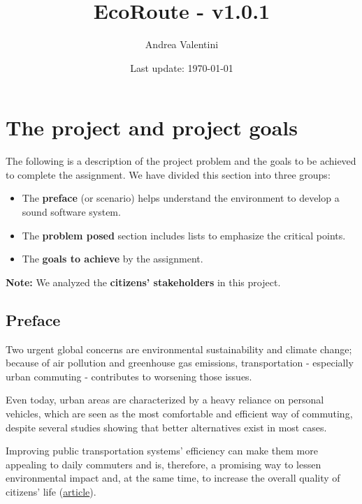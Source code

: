 \documentclass[a4paper]{article}
\newcommand{\highspace}{\vspace{1.2em}\noindent}
\begin{document}
    \author{Andrea Valentini}
    \title{EcoRoute - v1.0.1}
    \date{Last update: \today}
    \maketitle

    \newpage

    \tableofcontents

    \newpage

    \pagestyle{fancy}
    \fancyhead{} %
    \fancyhead[R]{\nouppercase{\leftmark\hfill\rightmark}}

    \section{The project and project goals}

    The following is a description of the project problem and the goals to be achieved to complete the assignment. We have divided this section into three groups:
    \begin{itemize}
        \item The \textbf{preface} (or scenario) helps understand the environment to develop a sound software system.

        \item The \textbf{problem posed} section includes lists to emphasize the critical points.

        \item The \textbf{goals to achieve} by the assignment.
    \end{itemize}
    \textbf{Note:} We analyzed the \textbf{citizens' stakeholders} in this project. 

    \subsection*{Preface}

    Two urgent global concerns are environmental sustainability and climate change; because of air pollution and greenhouse gas emissions, transportation - especially urban commuting - contributes to worsening those issues.

    \highspace
    Even today, urban areas are characterized by a heavy reliance on personal vehicles, which are seen as the most comfortable and efficient way of commuting, despite several studies showing that better alternatives exist in most cases.

    \highspace
    Improving public transportation systems' efficiency can make them more appealing to daily commuters and is, therefore, a promising way to lessen environmental impact and, at the same time, to increase the overall quality of citizens' life (\href{https://journals.plos.org/plosone/article?id=10.1371/journal.pone.0223650}{article}).
\end{document}
